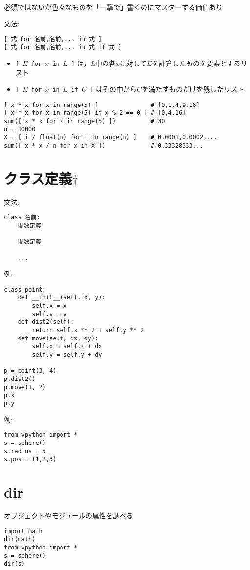 \documentclass[landscape,7pt,dvipdfmx]{article}
\newcommand{\ao}[1]{{\color{blue}{#1}}}
\begin{document}
\begin{multicols*}{3}
\section{\ao{リスト内包表記}}
必須ではないが色々なものを「一撃で」書くのにマスターする価値あり

文法:
\begin{lstlisting}
[ 式 for 名前,名前,... in 式 ]
[ 式 for 名前,名前,... in 式 if 式 ]
\end{lstlisting}

\begin{itemize}
\item {\tt [ $E$ for $x$ in $L$ ]}
は，$L$中の各$x$に対して$E$を計算したものを要素とするリスト
\item 
{\tt [ $E$ for $x$ in $L$ if $C$ ]}
はその中から$C$を満たすものだけを残したリスト
\end{itemize}

\begin{lstlisting}
[ x * x for x in range(5) ]               # [0,1,4,9,16]
[ x * x for x in range(5) if x % 2 == 0 ] # [0,4,16]
sum([ x * x for x in range(5) ])          # 30
n = 10000
X = [ i / float(n) for i in range(n) ]    # 0.0001,0.0002,...
sum([ x * x / n for x in X ])             # 0.33328333... 
\end{lstlisting}

\section{クラス定義$\dagger$}
文法:
\begin{lstlisting}
class 名前:
    関数定義

    関数定義

    ...
\end{lstlisting}
例:
\begin{lstlisting}
class point:
    def __init__(self, x, y):
        self.x = x
        self.y = y
    def dist2(self):
        return self.x ** 2 + self.y ** 2
    def move(self, dx, dy):
        self.x = self.x + dx
        self.y = self.y + dy

p = point(3, 4)
p.dist2()
p.move(1, 2)
p.x
p.y
\end{lstlisting}
例:
\begin{lstlisting}
from vpython import *
s = sphere()
s.radius = 5
s.pos = (1,2,3)
\end{lstlisting}

\section{dir}
オブジェクトやモジュールの属性を調べる
\begin{lstlisting}
import math
dir(math)
from vpython import *
s = sphere()
dir(s)
\end{lstlisting}


\end{multicols*}
\end{document}
